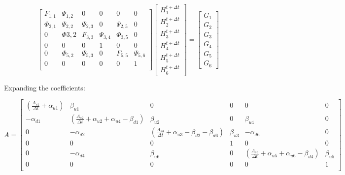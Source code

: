 \documentclass[11pt]{article}
\begin{document}
\begin{equation}
  \begin{bmatrix}
   F_{1,1} & \Psi_{1,2} & 0 & 0 & 0 & 0 \\
   \Phi_{2,1} & \Psi_{2,2} & \Psi_{2,3} & 0 & \Psi_{2,5} & 0 \\
   0 & \Phi{3,2} & F_{3,3} & \Psi_{3,4} & \Phi_{3,5} & 0 \\
   0 & 0 & 0 & 1 & 0 & 0 \\
   0 & \Phi_{5,2} & \Psi_{5,3} & 0 & F_{5,5} & \Psi_{5,6} \\
   0 & 0 & 0 & 0 & 0 & 1 \\
  \end{bmatrix}
  \begin{bmatrix}
    H_{1}^{t + \Delta t} \\ H_{2}^{t + \Delta t} \\ H_{3}^{t + \Delta t} \\ H_{4}^{t + \Delta t} \\
    H_{5}^{t + \Delta t} \\ H_{6}^{t + \Delta t}
  \end{bmatrix}
  =
  \begin{bmatrix}
   G_1 \\ G_2 \\ G_3 \\ G_4 \\ G_5 \\ G_6 
  \end{bmatrix}
\end{equation}

Expanding the coefficients:

\begin{equation}
  A = 
  \begin{bmatrix}
   ( \frac{A_{s1}}{\Delta t} + \alpha_{u1} ) & \beta_{u1} & 0 & 0 & 0 & 0 \\ 
   - \alpha_{d1} & ( \frac{A_{s2}}{\Delta t} + \alpha_{u2} + \alpha_{u4} - \beta_{d1} ) & \beta_{u2} & 0 & \beta_{u4} & 0 \\
   0 & - \alpha_{d2} & ( \frac{A_{s3}}{\Delta t} + \alpha_{u3} - \beta_{d2} - \beta_{d6} ) & \beta_{u3} & - \alpha_{d6} & 0 \\
   0 & 0 & 0 & 1 & 0 & 0 \\
   0 & - \alpha_{d4} & \beta_{u6} & 0 & ( \frac{A_{s5}}{\Delta t} + \alpha_{u5} + \alpha_{u6} - \beta_{d4} ) & \beta_{u5} \\
   0 & 0 & 0 & 0 & 0 & 1 \\
  \end{bmatrix}
\end{equation}
\end{document}
